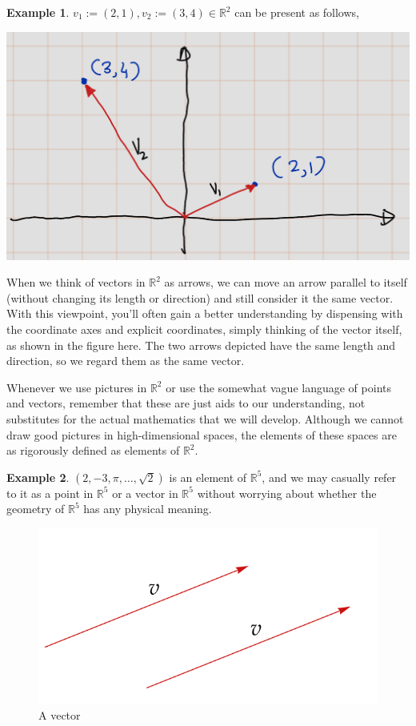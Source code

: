 \documentclass[
]{book}
\theoremstyle{definition}
\theoremstyle{definition}
\newtheorem{example}{Example}[chapter]
\theoremstyle{definition}
\theoremstyle{definition}
\theoremstyle{remark}
\begin{document}
\begin{example}
\protect\hypertarget{exm:unnamed-chunk-15}{}\label{exm:unnamed-chunk-15}\(v_1:=(2,1),v_2:=(3,4)\in \mathbb{R}^2\) can be present as follows,
\end{example}

\includegraphics{fig/Chapter-1/fig4.png}

When we think of vectors in \(\mathbb{R}^2\) as arrows, we can move an arrow parallel to itself (without changing its length or direction) and still consider it the same vector. With this viewpoint, you'll often gain a better understanding by dispensing with the coordinate axes and explicit coordinates, simply thinking of the vector itself, as shown in the figure here. The two arrows depicted have the same length and direction, so we regard them as the same vector.

Whenever we use pictures in \(\mathbb{R}^2\) or use the somewhat vague language of points and vectors, remember that these are just aids to our understanding, not substitutes for the actual mathematics that we will develop. Although we cannot draw good pictures in high-dimensional spaces, the elements of these spaces are as rigorously defined as elements of \(\mathbb{R}^2\).

\begin{example}
\protect\hypertarget{exm:unnamed-chunk-16}{}\label{exm:unnamed-chunk-16}\((2, -3, \pi, \ldots, \sqrt{2})\) is an element of \(\mathbb{R}^5\), and we may casually refer to it as a point in \(\mathbb{R}^5\) or a vector in \(\mathbb{R}^5\) without worrying about whether the geometry of \(\mathbb{R}^5\) has any physical meaning.
\end{example}

\begin{figure}
\centering
\includegraphics{fig/Chapter-1/fig5.png}
\caption{A vector}
\end{figure}
\end{document}
